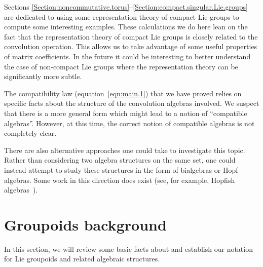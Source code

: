 \documentclass[10pt,a4paper]{amsart}
\numberwithin{equation}{section}
\theoremstyle{definition}
\begin{document}
Sections \ref{Section:noncommutative.torus}--\ref{Section:compact.singular.Lie.groups} are dedicated to using some representation theory of compact Lie groups to compute some interesting examples. These calculations we do here lean on the fact that the representation theory of compact Lie groups is closely related to the convolution operation. This allows us to take advantage of some useful properties of matrix coefficients. In the future it could be interesting to better understand the case of non-compact Lie groups where the representation theory can be significantly more subtle.

The compatibility law (equation~\eqref{eqn:main.1}) that we have proved relies on specific facts about the structure of the convolution algebras involved. We suspect that there is a more general form which might lead to a notion of ``compatible algebras''. However, at this time, the correct notion of compatible algebras is not completely clear.

There are also alternative approaches one could take to investigate this topic. Rather than considering two algebra structures on the same set, one could instead attempt to study these structures in the form of bialgebras or Hopf algebras. Some work in this direction does exist (see, for example, Hopfish algebras~\cite{Hopfish2,Hopfish}).

\section{Groupoids background}\label{sec2}
In this section, we will review some basic facts about and establish our notation for Lie groupoids and related algebraic structures.
\end{document}
